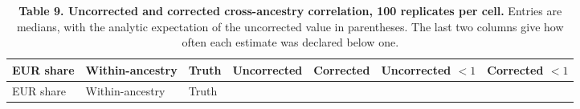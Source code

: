 \documentclass[11pt,a4paper]{article}
\begin{document}
\begin{longtable}[]{@{}
  >{\raggedright\arraybackslash}p{}
  >{\raggedleft\arraybackslash}p{}
  >{\raggedleft\arraybackslash}p{}
  >{\raggedleft\arraybackslash}p{}
  >{\raggedleft\arraybackslash}p{}
  >{\raggedleft\arraybackslash}p{}
  >{\raggedleft\arraybackslash}p{}@{}}
\caption{\textbf{Table 9. Uncorrected and corrected cross-ancestry correlation, 100 replicates per cell.} Entries are medians, with the analytic expectation of the uncorrected value in parentheses. The last two columns give how often each estimate was declared below one.}\tabularnewline
\toprule\noalign{}
\begin{minipage}[b]{\linewidth}\raggedright
EUR share
\end{minipage} & \begin{minipage}[b]{\linewidth}\raggedleft
Within-ancestry
\end{minipage} & \begin{minipage}[b]{\linewidth}\raggedleft
Truth
\end{minipage} & \begin{minipage}[b]{\linewidth}\raggedleft
Uncorrected
\end{minipage} & \begin{minipage}[b]{\linewidth}\raggedleft
Corrected
\end{minipage} & \begin{minipage}[b]{\linewidth}\raggedleft
Uncorrected \(<1\)
\end{minipage} & \begin{minipage}[b]{\linewidth}\raggedleft
Corrected \(<1\)
\end{minipage} \\
\midrule\noalign{}
\endfirsthead
\toprule\noalign{}
\begin{minipage}[b]{\linewidth}\raggedright
EUR share
\end{minipage} & \begin{minipage}[b]{\linewidth}\raggedleft
Within-ancestry
\end{minipage} & \begin{minipage}[b]{\linewidth}\raggedleft
Truth
\end{minipage} & \begin{minipage}[b]{\linewidth}\raggedleft

\end{minipage}
\end{longtable}
\end{document}
